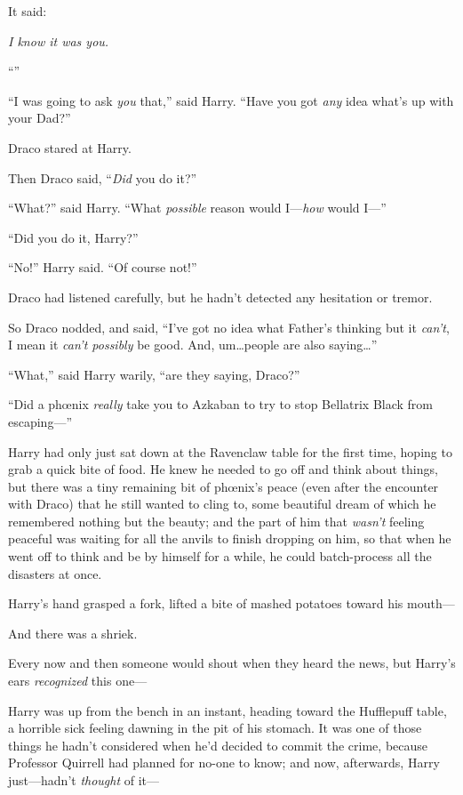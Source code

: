 It said:

\emph{I know it was you.}

“\emph{}”

“I was going to ask \emph{you} that,” said Harry. “Have you got \emph{any} idea what’s up with your Dad?”

Draco stared at Harry.

Then Draco said, “\emph{Did} you do it?”

“What?” said Harry. “What \emph{possible} reason would I—\emph{how} would I—”

“Did you do it, Harry?”

“No!” Harry said. “Of course not!”

Draco had listened carefully, but he hadn’t detected any hesitation or tremor.

So Draco nodded, and said, “I’ve got no idea what Father’s thinking but it \emph{can’t}, I mean it \emph{can’t possibly} be good. And, um…people are also saying…”

“What,” said Harry warily, “are they saying, Draco?”

“Did a phœnix \emph{really} take you to Azkaban to try to stop Bellatrix Black from escaping—”


Harry had only just sat down at the Ravenclaw table for the first time, hoping to grab a quick bite of food. He knew he needed to go off and think about things, but there was a tiny remaining bit of phœnix’s peace (even after the encounter with Draco) that he still wanted to cling to, some beautiful dream of which he remembered nothing but the beauty; and the part of him that \emph{wasn’t} feeling peaceful was waiting for all the anvils to finish dropping on him, so that when he went off to think and be by himself for a while, he could batch-process all the disasters at once.

Harry’s hand grasped a fork, lifted a bite of mashed potatoes toward his mouth—

And there was a shriek.

Every now and then someone would shout when they heard the news, but Harry’s ears \emph{recognized} this one—

Harry was up from the bench in an instant, heading toward the Hufflepuff table, a horrible sick feeling dawning in the pit of his stomach. It was one of those things he hadn’t considered when he’d decided to commit the crime, because Professor Quirrell had planned for no-one to know; and now, afterwards, Harry just—hadn’t \emph{thought} of it—

